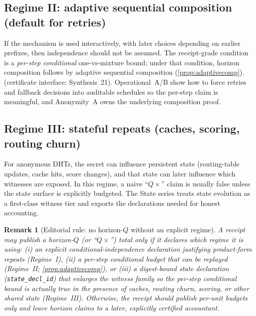 \documentclass[11pt]{article}
\newtheorem{remark}{Remark}
\begin{document}
\subsection{Regime II: adaptive sequential composition (default for retries)}
If the mechanism is used interactively, with later choices depending on earlier prefixes, then independence should not be assumed.
The receipt-grade condition is a \emph{per-step conditional} one-vs-mixture bound; under that condition, horizon composition follows by adaptive sequential composition (\cref{prop:adaptivecomp}). (certificate interface: Synthesis~21).\cite{series:condcert}
Operational~A/B show how to force retries and fallback decisions into auditable schedules so the per-step claim is meaningful, and Anonymity~A owns the underlying composition proof.\cite{series:operationalA,series:operationalB,series:oddsinflation}

\subsection{Regime III: stateful repeats (caches, scoring, routing churn)}
For anonymous DHTs, the secret can influence persistent state (routing-table updates, cache hits, score changes), and that state can later influence which witnesses are exposed.
In this regime, a naive ``$Q\times$'' claim is usually false unless the state surface is explicitly budgeted.
The State series treats state evolution as a first-class witness tier and exports the declarations needed for honest accounting.\cite{series:state1}

\begin{remark}[Editorial rule: no horizon-$Q$ without an explicit regime]
A receipt may publish a horizon-$Q$ (or ``$Q\times$'') total only if it declares which regime it is using:
(i) an explicit conditional-independence declaration justifying product-form repeats (Regime~I),
(ii) a per-step conditional budget that can be replayed (Regime~II; \cref{prop:adaptivecomp}), or
(iii) a digest-bound state declaration (\texttt{state\_decl\_id}) that enlarges the witness family so the per-step conditional bound is actually true in the presence of caches, routing churn, scoring, or other shared state (Regime~III).\cite{series:planstateequiv,series:state1}
Otherwise, the receipt should publish per-unit budgets only and leave horizon claims to a later, explicitly certified accountant.
\end{remark}
\end{document}
